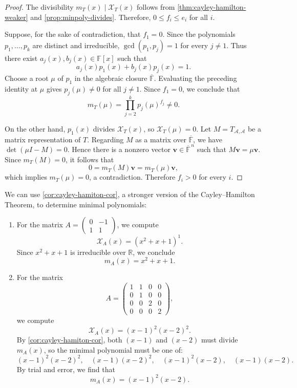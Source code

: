 \begin{proof}
The divisibility $m_T(x)\mid\mathcal{X}_T(x)$ follows from
\autoref{thm:cayley-hamilton-weaker} and \autoref{prop:minpoly-divides}.
Therefore, $0\leq f_i\leq e_i$ for all $i$.

Suppose, for the sake of contradiction, that $f_1=0$.
Since the polynomials $p_1,\ldots,p_k$ are distinct and irreducible,
$\gcd(p_1,p_j)=1$ for every $j\neq 1$. Thus there exist
$a_j(x),b_j(x)\in\mathbb{F}[x]$ such that
\[
a_j(x)p_1(x)+b_j(x)p_j(x)=1.
\]
Choose a root $\mu$ of $p_1$ in the algebraic closure
$\overline{\mathbb{F}}$. Evaluating the preceding identity at $\mu$ gives
$p_j(\mu)\neq 0$ for all $j\neq 1$. Since $f_1=0$, we conclude that
\[
m_T(\mu)=\prod_{j=2}^k p_j(\mu)^{f_j}\neq 0.
\]

On the other hand, $p_1(x)$ divides $\mathcal{X}_T(x)$, so
$\mathcal{X}_T(\mu)=0$. Let $M=T_{\mathcal A,\mathcal A}$ be a matrix
representation of $T$. Regarding $M$ as a matrix over
$\overline{\mathbb{F}}$, we have $\det(\mu I-M)=0$. Hence there is a
nonzero vector $\mathbf v\in\overline{\mathbb{F}}^{\,n}$ such that
$M\mathbf v=\mu\mathbf v$. Since $m_T(M)=0$, it follows that
\[
0=m_T(M)\mathbf v=m_T(\mu)\mathbf v,
\]
which implies $m_T(\mu)=0$, a contradiction.
Therefore $f_i>0$ for every $i$.
\end{proof}

\begin{example}\label{ex:minpoly-examples}
We can use \autoref{cor:cayley-hamiton-cor}, a stronger version of the Cayley–Hamilton Theorem, to determine minimal polynomials:

\begin{enumerate}
  \item For the matrix \( A = \begin{pmatrix} 0 & -1 \\ 1 & 1 \end{pmatrix} \), we compute
  \[
  \mathcal{X}_A(x) = \left(x^2 + x + 1\right)^1.
  \]
  Since \( x^2 + x + 1 \) is irreducible over \( \mathbb{R} \), we conclude
  \[
  m_A(x) = x^2 + x + 1.
  \]

  \item For the matrix
  \[
  A = \begin{pmatrix}
  1 & 1 & 0 & 0 \\
  0 & 1 & 0 & 0 \\
  0 & 0 & 2 & 0 \\
  0 & 0 & 0 & 2
  \end{pmatrix},
  \]
  we compute
  \[
  \mathcal{X}_A(x) = (x - 1)^2(x - 2)^2.
  \]
  By \autoref{cor:cayley-hamiton-cor}, both \( (x - 1) \) and \( (x - 2) \) must divide \( m_A(x) \), so the minimal polynomial must be one of:
  \[
  (x - 1)^2(x - 2)^2, \quad (x - 1)(x - 2)^2, \quad (x - 1)^2(x - 2), \quad (x - 1)(x - 2).
  \]
  By trial and error, we find that
  \[
  m_A(x) = (x - 1)^2(x - 2).
  \]
\end{enumerate}
\end{example}